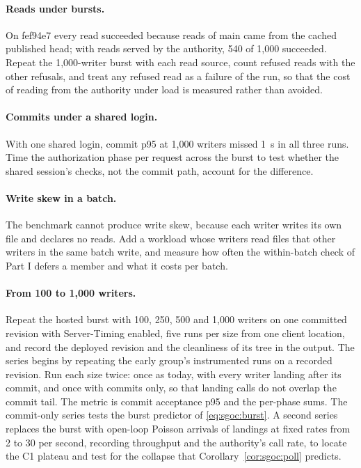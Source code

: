 \documentclass[11pt,letterpaper]{article}
\theoremstyle{definition}
\theoremstyle{remark}
\begin{document}
\paragraph{Reads under bursts.} On fef94e7 every read succeeded because reads of main came from the cached published head; with reads served by the authority, 540 of 1,000 succeeded. %
Repeat the 1,000-writer burst with each read source, count refused reads with the other refusals, and treat any refused read as a failure of the run, so that the cost of reading from the authority under load is measured rather than avoided.

\paragraph{Commits under a shared login.} With one shared login, commit p95 at 1,000 writers missed 1~s in all three runs. %
Time the authorization phase per request across the burst to test whether the shared session's checks, not the commit path, account for the difference.

\paragraph{Write skew in a batch.} The benchmark cannot produce write skew, because each writer writes its own file and declares no reads. Add a workload whose writers read files that other writers in the same batch write, and measure how often the within-batch check of Part I defers a member and what it costs per batch.

\paragraph{From 100 to 1,000 writers.} Repeat the hosted burst with 100, 250, 500 and 1,000 writers on one committed revision with Server-Timing enabled, five runs per size from one client location, and record the deployed revision and the cleanliness of its tree in the output. The series begins by repeating the early group's instrumented runs on a recorded revision. Run each size twice: once as today, with every writer landing after its commit, and once with commits only, so that landing calls do not overlap the commit tail. The metric is commit acceptance p95 and the per-phase sums. The commit-only series tests the burst predictor of \cref{eq:sgoc:burst}. A second series replaces the burst with open-loop Poisson arrivals of landings at fixed rates from 2 to 30 per second, recording throughput and the authority's call rate, to locate the C1 plateau and test for the collapse that Corollary~\ref{cor:sgoc:poll} predicts.
\end{document}
